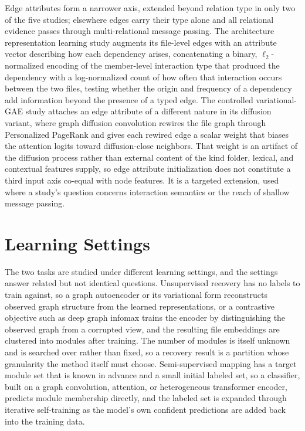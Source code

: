 Edge attributes form a narrower axis, extended beyond relation type in only two of the five studies; elsewhere edges carry their type alone and all relational evidence passes through multi-relational message passing. The architecture representation learning study augments its file-level edges with an attribute vector describing how each dependency arises, concatenating a binary, $\ell_2$-normalized encoding of the member-level interaction type that produced the dependency with a log-normalized count of how often that interaction occurs between the two files, testing whether the origin and frequency of a dependency add information beyond the presence of a typed edge. The controlled variational-GAE study attaches an edge attribute of a different nature in its diffusion variant, where graph diffusion convolution rewires the file graph through Personalized PageRank and gives each rewired edge a scalar weight that biases the attention logits toward diffusion-close neighbors. That weight is an artifact of the diffusion process rather than external content of the kind folder, lexical, and contextual features supply, so edge attribute initialization does not constitute a third input axis co-equal with node features. It is a targeted extension, used where a study's question concerns interaction semantics or the reach of shallow message passing.

\section{Learning Settings}
\label{sec:method-learning}

The two tasks are studied under different learning settings, and the settings answer related but not identical questions. Unsupervised recovery has no labels to train against, so a graph autoencoder or its variational form reconstructs observed graph structure from the learned representations, or a contrastive objective such as deep graph infomax trains the encoder by distinguishing the observed graph from a corrupted view, and the resulting file embeddings are clustered into modules after training. The number of modules is itself unknown and is searched over rather than fixed, so a recovery result is a partition whose granularity the method itself must choose. Semi-supervised mapping has a target module set that is known in advance and a small initial labeled set, so a classifier, built on a graph convolution, attention, or heterogeneous transformer encoder, predicts module membership directly, and the labeled set is expanded through iterative self-training as the model's own confident predictions are added back into the training data.


